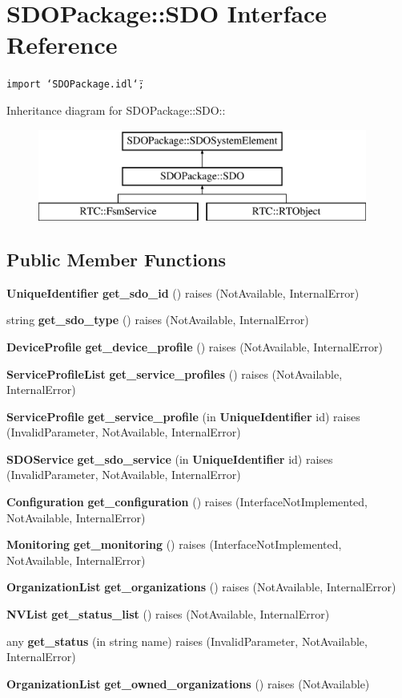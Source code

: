 \section{SDOPackage::SDO Interface Reference}
\label{interfaceSDOPackage_1_1SDO}
{\tt import \char`\"{}SDOPackage.idl\char`\"{};}

Inheritance diagram for SDOPackage::SDO::\begin{figure}[H]
\begin{center}
\leavevmode
\includegraphics[height=3cm]{interfaceSDOPackage_1_1SDO}
\end{center}
\end{figure}
\subsection*{Public Member Functions}
\begin{CompactItemize}
\item 
{\bf Unique\-Identifier} {\bf get\_\-sdo\_\-id} ()  raises (Not\-Available, Internal\-Error)
\item 
string {\bf get\_\-sdo\_\-type} ()  raises (Not\-Available, Internal\-Error)
\item 
{\bf Device\-Profile} {\bf get\_\-device\_\-profile} ()  raises (Not\-Available, Internal\-Error)
\item 
{\bf Service\-Profile\-List} {\bf get\_\-service\_\-profiles} ()  raises (Not\-Available, Internal\-Error)
\item 
{\bf Service\-Profile} {\bf get\_\-service\_\-profile} (in {\bf Unique\-Identifier} id)  raises (Invalid\-Parameter, Not\-Available, Internal\-Error)
\item 
{\bf SDOService} {\bf get\_\-sdo\_\-service} (in {\bf Unique\-Identifier} id)  raises (Invalid\-Parameter, Not\-Available, Internal\-Error)
\item 
{\bf Configuration} {\bf get\_\-configuration} ()  raises (Interface\-Not\-Implemented, Not\-Available, Internal\-Error)
\item 
{\bf Monitoring} {\bf get\_\-monitoring} ()  raises (Interface\-Not\-Implemented, Not\-Available, Internal\-Error)
\item 
{\bf Organization\-List} {\bf get\_\-organizations} ()  raises (Not\-Available, Internal\-Error)
\item 
{\bf NVList} {\bf get\_\-status\_\-list} ()  raises (Not\-Available, Internal\-Error)
\item 
any {\bf get\_\-status} (in string name)  raises (Invalid\-Parameter, Not\-Available, Internal\-Error)
\item 
{\bf Organization\-List} {\bf get\_\-owned\_\-organizations} ()  raises (Not\-Available)
\end{CompactItemize}



